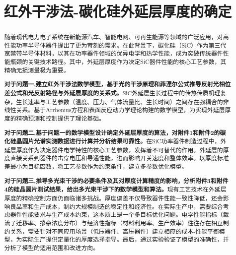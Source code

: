\documentclass[withoutpreface,bwprint]{cumcmthesis}
\title{红外干涉法-碳化硅外延层厚度的确定}  %
\begin{document}
\maketitle
\begin{abstract}
随着现代电力电子系统在新能源汽车、智能电网、可再生能源等领域的广泛应用，对高性能功率半导体器件提出了更为苛刻的需求。在此背景下，碳化硅（SiC）作为第三代宽禁带半导体材料，以其在功率器件领域的优异电学和热学性能，成为突破传统器件性能瓶颈的关键技术路径。其中，外延层厚度作为决定SiC器件性能的核心工艺参数，其精确无损测量极为重要。

\textbf{对于问题一,}\textbf{建立红外干涉法数学模型，基于光的干涉原理和菲涅尔公式推导反射光相位差公式和光反射路径与外延层厚度的关系式。}$\text{SiC}$外延层生长过程中的传热传质机理复杂，生长速率与工艺参数（温度、压力、气体流量比、生长时间）之间存在强耦合的非线性关系。基于Arrhenius方程和表面反应动力学理论构建的数学模型，为实现外延层厚度的精确预测和控制提供了理论基础。

\textbf{对于问题二,}\textbf{基于问题一的数学模型设计确定外延层厚度的算法，对附件1和附件2的碳化硅晶圆片光谱实测数据进行计算并分析结果可靠性。}在SiC功率器件制造过程中，外延层厚度作为决定器件电学特性的核心工艺参数，发挥着不可替代的作用。外延层的厚度直接关系到器件的击穿电压和导通性能，进而影响开关速度和整体效率。以厚度标准差最小为目标函数，将工艺参数作为约束条件，建立多参数优化模型。

\textbf{对于问题三,}\textbf{推导多光束干涉的必要条件及其对厚度计算精度的影响，分析附件3和附件4的硅晶圆片测试结果，给出多光束干涉下的数学模型和算法。}现有工艺技术在外延层厚度的精确控制方面仍面临诸多挑战。厚度偏差不仅导致器件性能一致性降低，还会影响良品率和生产成本，制约大规模制造的稳定性和经济性。在实际生产中，需要综合考虑器件性能要求与生产成本约束，这本质上是一个多目标优化问题。电学性能指标（载流子迁移率、掺杂浓度分布）与经济性指标（材料利用率、生产效率）往往存在相互制约关系，需要针对不同应用场景（低压器件、高压器件）建立相应的成本-性能平衡模型，为实际生产提供定量化的厚度选择指导。最后，通过实验验证了模型的准确性，并分析了模型的适用范围和改进方向。

\textbf{}

\end{abstract}



\end{document}
